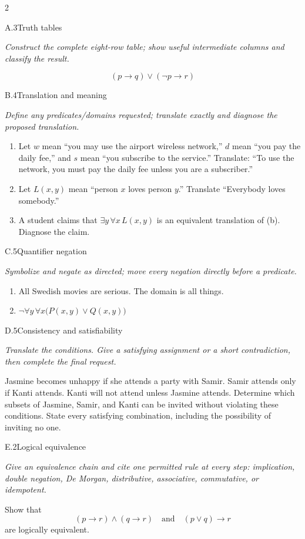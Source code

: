 \documentclass[9pt]{extarticle}
\begin{document}
\CoreWorkArea
\FormBreak
{}
\begin{multicols}{2}
\begin{CoreProblem}{A.3}{Truth tables}
{\scriptsize\textit{Construct the complete eight-row table; show useful intermediate columns and classify the result.}\par}
\[
  (p\to q)\lor(\neg p\to r)
\]
\end{CoreProblem}
\begin{CoreProblem}{B.4}{Translation and meaning}
{\scriptsize\textit{Define any predicates/domains requested; translate exactly and diagnose the proposed translation.}\par}
\begin{enumerate}[label=(\alph*)]
  \item Let $w$ mean ``you may use the airport wireless network,'' $d$ mean
        ``you pay the daily fee,'' and $s$ mean ``you subscribe to the
        service.'' Translate: ``To use the network, you must pay the daily fee
        unless you are a subscriber.''
  \item Let $L(x,y)$ mean ``person $x$ loves person $y$.'' Translate
        ``Everybody loves somebody.''
  \item A student claims that $\exists y\,\forall x\,L(x,y)$ is an equivalent
        translation of (b). Diagnose the claim.
\end{enumerate}
\end{CoreProblem}
\begin{CoreProblem}{C.5}{Quantifier negation}
{\scriptsize\textit{Symbolize and negate as directed; move every negation directly before a predicate.}\par}
\begin{enumerate}[label=(\alph*)]
  \item All Swedish movies are serious. The domain is all things.
  \item $\neg\forall y\,\forall x\bigl(P(x,y)\lor Q(x,y)\bigr)$
\end{enumerate}
\end{CoreProblem}
\columnbreak
\begin{CoreProblem}{D.5}{Consistency and satisfiability}
{\scriptsize\textit{Translate the conditions. Give a satisfying assignment or a short contradiction, then complete the final request.}\par}
Jasmine becomes unhappy if she attends a party with Samir. Samir attends only
if Kanti attends. Kanti will not attend unless Jasmine attends. Determine which
subsets of Jasmine, Samir, and Kanti can be invited without violating these
conditions. State every satisfying combination, including the possibility of
inviting no one.
\end{CoreProblem}
\begin{CoreProblem}{E.2}{Logical equivalence}
{\scriptsize\textit{Give an equivalence chain and cite one permitted rule at every step: implication, double negation, De Morgan, distributive, associative, commutative, or idempotent.}\par}
Show that
\[
  (p\to r)\land(q\to r)
  \quad\text{and}\quad
  (p\lor q)\to r
\]
are logically equivalent.
\end{CoreProblem}
\end{multicols}
\end{document}
